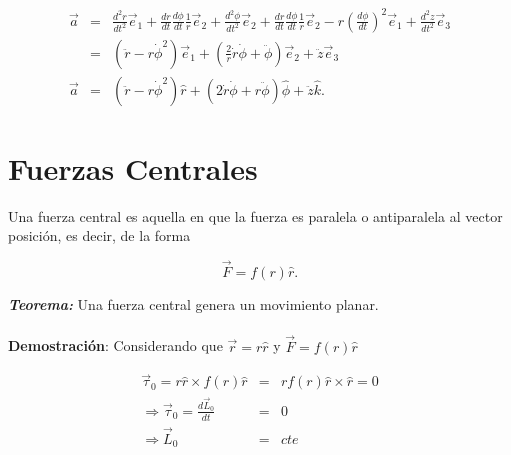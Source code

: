 \documentclass[12pt]{report}
\begin{document}
\begin{eqnarray} \nonumber
\vec{a} &=& \frac{d^2r}{dt^2} \vec{e}_1 + \frac{dr}{dt} \frac{d\phi}{dt} \frac{1}{r} \vec{e}_2 + \frac{d^2\phi}{dt^2} \vec{e}_2 + \frac{dr}{dt} \frac{d\phi}{dt} \frac{1}{r} \vec{e}_2 - r\left(\frac{d\phi}{dt}  \right)^2 \vec{e}_1  + \frac{d^2 z}{dt^2} \vec{e}_3 \\ \nonumber
&=& \left( \ddot{r}- r \dot{\phi}^2 \right)\vec{e}_1 + \left( \frac{2}{r} \dot{r} \dot{\phi} + \ddot{\phi}  \right)\vec{e}_2 + \ddot{z} \vec{e}_3 \\ \label{108}
\vec{a} &=& \left( \ddot{r}- r \dot{\phi}^2 \right)\hat{r} + \left( 2 \dot{r} \dot{\phi} + r\ddot{\phi}  \right)\hat{\phi} + \ddot{z} \hat{k}.  
\end{eqnarray}

























 

\chapter{Fuerzas Centrales}\label{chapter3}


Una fuerza central es aquella en que la fuerza es paralela o antiparalela al vector posición, es decir, de la forma 

\begin{equation} \label{3.1}
\vec{F}= f(r)\hat{r}.
\end{equation}

\textbf{\textit{Teorema:}} Una fuerza central genera un movimiento planar. \\
\\
\textbf{Demostración}: Considerando  que $\vec{r}=r\hat{r}$ y $\vec{F}=f(r)\hat{r}$

\begin{eqnarray} \nonumber
\vec{\tau}_0=r\hat{r} \times f(r)\hat{r}&=&rf(r)\hat{r} \times \hat{r}=0 \\ \nonumber
\Rightarrow \vec{\tau}_0 = \frac{d\vec{L}_0}{dt}&=&0 \\ \nonumber
\Rightarrow \vec{L}_{0} &=& cte
\end{eqnarray}
\end{document}
